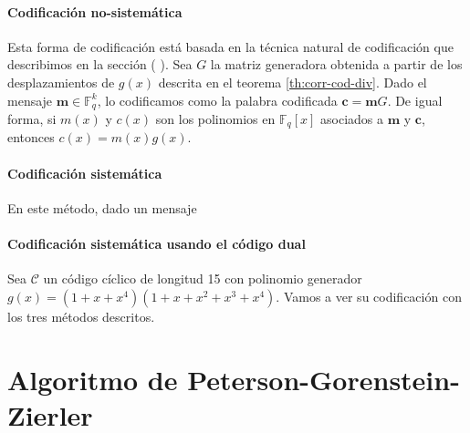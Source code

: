 \paragraph{Codificación no-sistemática}

Esta forma de codificación está basada en la técnica natural de codificación que describimos en la sección (
).
Sea \(G\) la matriz generadora obtenida a partir de los desplazamientos de \(g(x)\) descrita en el teorema \ref{th:corr-cod-div}.
Dado el mensaje \(\mathbf m \in \mathbb F_q^k\), lo codificamos como la palabra codificada \(\mathbf c = \mathbf mG\).
De igual forma, si \(m(x)\) y \(c(x)\) son los polinomios en \(\mathbb F_q[x]\) asociados a \(\mathbf{m}\) y \(\mathbf c\), entonces \(c(x) = m(x)g(x)\).

\paragraph{Codificación sistemática}

En este método, dado un mensaje 

\paragraph{Codificación sistemática usando el código dual}

\begin{example}
  Sea \(\mathcal C\) un código cíclico de longitud 15 con polinomio generador \(g(x) = (1 + x + x^4)(1 + x + x^2 + x^3 + x^4)\). Vamos a ver su codificación con los tres métodos descritos.
\end{example}

\section{Algoritmo de Peterson-Gorenstein-Zierler}